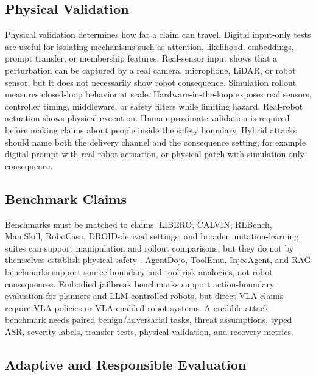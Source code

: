 \subsection{Physical Validation}

Physical validation determines how far a claim can travel. Digital input-only tests are useful for isolating mechanisms such as attention, likelihood, embeddings, prompt transfer, or membership features. Real-sensor input shows that a perturbation can be captured by a real camera, microphone, LiDAR, or robot sensor, but it does not necessarily show robot consequence. Simulation rollout measures closed-loop behavior at scale. Hardware-in-the-loop exposes real sensors, controller timing, middleware, or safety filters while limiting hazard. Real-robot actuation shows physical execution. Human-proximate validation is required before making claims about people inside the safety boundary. Hybrid attacks should name both the delivery channel and the consequence setting, for example digital prompt with real-robot actuation, or physical patch with simulation-only consequence.

\subsection{Benchmark Claims}



Benchmarks must be matched to claims. LIBERO, CALVIN, RLBench, ManiSkill, RoboCasa, DROID-derived settings, and broader imitation-learning suites can support manipulation and rollout comparisons, but they do not by themselves establish physical safety \cite{liu2023libero,mees2022calvin,james2020rlbench,mu2021maniskill,nasiriany2024robocasa} \cite{khazatsky2024droid,robocasa365,mandlekar2021robomimic,fu2020d4rl,yu2020metaworld,zhu2020robosuite}. AgentDojo, ToolEmu, InjecAgent, and RAG benchmarks support source-boundary and tool-risk analogies, not robot consequences. Embodied jailbreak benchmarks support action-boundary evaluation for planners and LLM-controlled robots, but direct VLA claims require VLA policies or VLA-enabled robot systems. A credible attack benchmark needs paired benign/adversarial tasks, threat assumptions, typed ASR, severity labels, transfer tests, physical validation, and recovery metrics.

\subsection{Adaptive and Responsible Evaluation}

